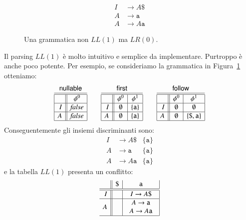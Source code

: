 \begin{figure}
\begin{align*}
I&\to A\mathtt{\$}\\
A&\to\mathtt{a}\\
A&\to A\mathtt{a}
\end{align*}
\caption{Una grammatica non $\mathit{LL}(1)$ ma $\mathit{LR}(0)$.}
  \label{fig:no_ll1_grammar}
\end{figure}
%
Il parsing $\mathit{LL}(1)$ \`e molto intuitivo e semplice da implementare.
Purtroppo \`e anche poco potente. Per esempio, se consideriamo la grammatica
in Figura~\ref{fig:no_ll1_grammar} otteniamo:
%
\[
  \begin{array}{|r||c|}
    \multicolumn{2}{c}{\nullable}\\\hline\hline
    & \phi^0 \\\hline
    I & \mathit{false} \\\hline
    A & \mathit{false} \\\hline
  \end{array}\qquad
  \begin{array}{|r||c|c|}
    \multicolumn{3}{c}{\first}\\\hline\hline
    & \phi^0 & \phi^1\\\hline
    I & \emptyset & \{\mathtt{a}\} \\\hline
    A & \emptyset & \{\mathtt{a}\} \\\hline
  \end{array}\qquad
  \begin{array}{|r||c|c|}
    \multicolumn{3}{c}{\follow}\\\hline\hline
    & \phi^0 & \phi^1 \\\hline
    I & \emptyset & \emptyset \\\hline
    A & \emptyset & \{\mathtt{\$},\mathtt{a}\} \\\hline
  \end{array}
\]
%
Conseguentemente gli insiemi discriminanti sono:
%
\begin{align*}
I&\to A\mathtt{\$} & \{\mathtt{a}\}\\
A&\to\mathtt{a} & \{\mathtt{a}\}\\
A&\to A\mathtt{a} & \{\mathtt{a}\}
\end{align*}
%
e la tabella $\mathit{LL}(1)$ presenta un conflitto:
%
\[
\begin{array}{r||c|c|}
 & \mathtt{\$} & \mathtt{a} \\\hline\hline
\mathit{I} & & I\to A\mathtt{\$} \\\hline
\mathit{A} & & \begin{array}{c}
    A\to\mathtt{a}\\ A\to A\mathtt{a}\end{array} \\\hline
\end{array}
\]
